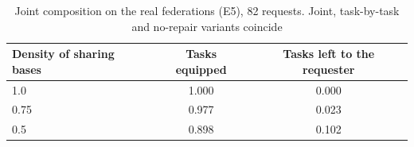 \begin{table}[t]
\caption{Joint composition on the real federations (E5), 82 requests. Joint, task-by-task and no-repair variants coincide}
\label{tab:e5}
\centering\small
\begin{tabular}{@{}lcc@{}}
\toprule
Density of sharing bases & Tasks equipped & Tasks left to the requester \\
\midrule
1.0 & 1.000 & 0.000 \\
0.75 & 0.977 & 0.023 \\
0.5 & 0.898 & 0.102 \\
\bottomrule
\end{tabular}
\end{table}
